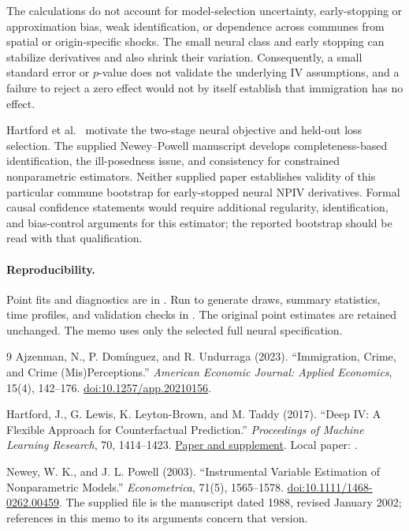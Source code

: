 The calculations do not account for model-selection uncertainty, early-stopping or approximation bias, weak identification, or dependence across communes from spatial or origin-specific shocks. The small neural class and early stopping can stabilize derivatives and also shrink their variation. Consequently, a small standard error or $p$-value does not validate the underlying IV assumptions, and a failure to reject a zero effect would not by itself establish that immigration has no effect.

Hartford et al.\ \cite{deepiv} motivate the two-stage neural objective and held-out loss selection. The supplied Newey--Powell manuscript \cite{neweypowell} develops completeness-based identification, the ill-posedness issue, and consistency for constrained nonparametric estimators. Neither supplied paper establishes validity of this particular commune bootstrap for early-stopped neural NPIV derivatives. Formal causal confidence statements would require additional regularity, identification, and bias-control arguments for this estimator; the reported bootstrap should be read with that qualification.

\paragraph{Reproducibility.}
Point fits and diagnostics are in . Run  to generate draws, summary statistics, time profiles, and validation checks in . The original point estimates are retained unchanged. The memo uses only the selected full neural specification.

\begin{thebibliography}{9}
Ajzenman, N., P. Dom\'{i}nguez, and R. Undurraga (2023).
``Immigration, Crime, and Crime (Mis)Perceptions.''
\emph{American Economic Journal: Applied Economics}, 15(4), 142--176.
\href{https://doi.org/10.1257/app.20210156}{doi:10.1257/app.20210156}.

Hartford, J., G. Lewis, K. Leyton-Brown, and M. Taddy (2017).
``Deep IV: A Flexible Approach for Counterfactual Prediction.''
\emph{Proceedings of Machine Learning Research}, 70, 1414--1423.
\href{https://proceedings.mlr.press/v70/hartford17a.html}{Paper and supplement}.
Local paper: .

Newey, W. K., and J. L. Powell (2003).
``Instrumental Variable Estimation of Nonparametric Models.''
\emph{Econometrica}, 71(5), 1565--1578.
\href{https://doi.org/10.1111/1468-0262.00459}{doi:10.1111/1468-0262.00459}.
The supplied file  is the manuscript dated 1988, revised January 2002; references in this memo to its arguments concern that version.
\end{thebibliography}

